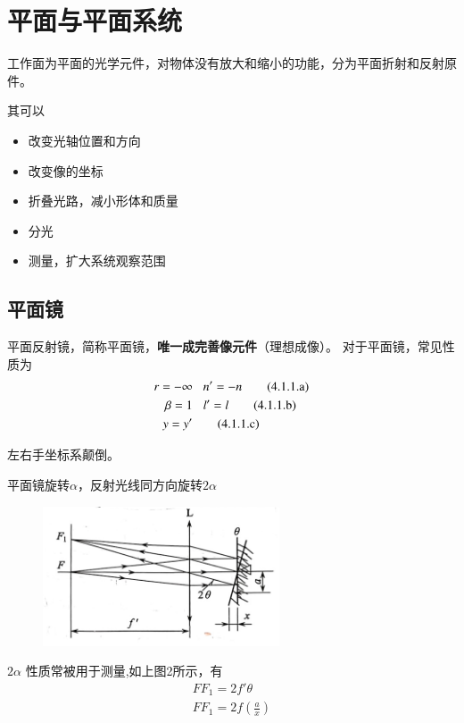 \section{平面与平面系统}
\begin{definition}[平面光学元件]
    工作面为平面的光学元件，对物体没有放大和缩小的功能，分为平面折射和反射原件。
    \end{definition}
其可以
\begin{itemize}[nosep]
\item 改变光轴位置和方向
\item 改变像的坐标
\item 折叠光路，减小形体和质量
\item 分光
\item 测量，扩大系统观察范围
\end{itemize}
\subsection{平面镜}
平面反射镜，简称平面镜，\textbf{唯一成完善像元件}（理想成像）。
对于平面镜，常见性质为
\begin{align}
    r=\mathbf{-}\infty &\hspace{0.3cm}   n'=-n\tag{4.1.1.a}\\
    \beta=1& \hspace{0.3cm} l'=l \tag{4.1.1.b}\\
   y=y'& \tag{4.1.1.c}
\end{align}
\begin{description}[leftmargin=0.9cm,style=nextline,nosep]%
    \item[镜像]  左右手坐标系颠倒。
    \item[$2\alpha$] 平面镜旋转$\alpha$，反射光线同方向旋转$2\alpha$
\end{description}
        \begin{figure}[H]
            \centering
            \includegraphics[width=7cm]{img/4.2.png}
            \end{figure}
$2\alpha$ 性质常被用于测量,如上图2所示，有
\begin{align}
    FF_1=2f'\theta \tag{4.1.2.a}\\
    FF_1=2f(\frac{a}{x}) \tag{4.1.2.b}
\end{align}
